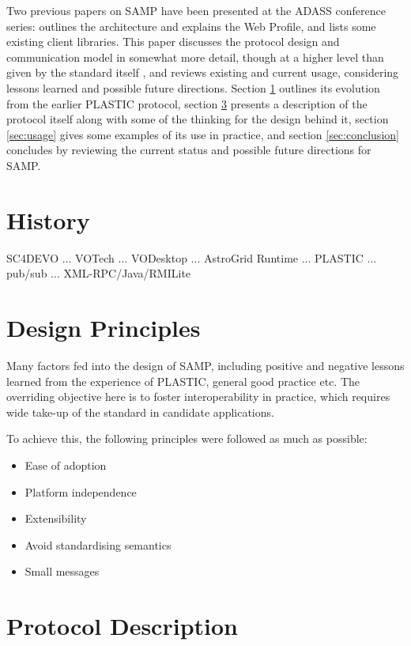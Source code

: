 \documentclass[5p]{elsarticle}
\begin{document}
Two previous papers on SAMP have been presented at the ADASS conference
series:
\citet{adassxxi_paper} outlines the architecture and explains
the Web Profile, and \citet{adassxxii_bof} lists some existing
client libraries.
This paper discusses the protocol design and communication model
in somewhat more detail, though at a higher level than given by the
standard itself \citep{samp_std}, and reviews existing and current
usage, considering lessons learned and possible future directions.
Section \ref{sec:history} outlines its evolution from
the earlier PLASTIC protocol,
section \ref{sec:protocol} presents a description of the protocol itself
along with some of the thinking for the design behind it,
section \ref{sec:usage} gives some examples of its use in practice, and
section \ref{sec:conclusion} concludes by reviewing the current status
and possible future directions for SAMP.

\section{History} \label{sec:history}
 
SC4DEVO ... VOTech ... VODesktop ... AstroGrid Runtime ...
PLASTIC ... pub/sub ... XML-RPC/Java/RMILite
\citep{plastic_note}


\section{Design Principles} \label{sec:design}

Many factors fed into the design of SAMP,
including positive and negative lessons learned
from the experience of PLASTIC, 
general good practice etc.
The overriding objective here is to foster interoperability in practice,
which requires wide take-up of the standard in candidate applications.

To achieve this, the following principles were followed as much as possible:
\begin{itemize}
\item Ease of adoption
\item Platform independence
\item Extensibility
\item Avoid standardising semantics
\item Small messages
\end{itemize}


\section{Protocol Description} \label{sec:protocol}
\end{document}
